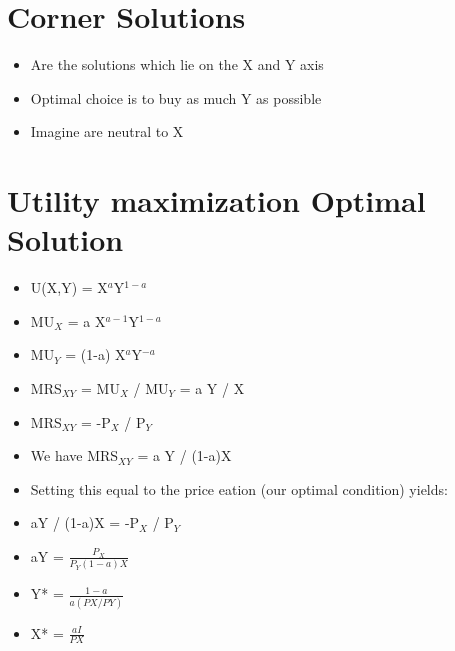 \documentclass{article}
\begin{document}
\section*{Corner Solutions}
\begin{itemize}
  \item Are the solutions which lie on the X and Y axis
  \item Optimal choice is to buy as much Y as possible
  \item Imagine are neutral to X
\end{itemize}

\section*{Utility maximization \Rightarrow{} Optimal Solution}
\begin{itemize}
  \item U(X,Y) = X$^a$Y$^{1-a}$
  \item MU$_X$ = a \times X$^{a-1}$Y$^{1-a}$
  \item MU$_Y$ = (1-a) \times X$^a$Y$^{-a}$
  \item MRS$_{XY}$ = MU$_X$ / MU$_Y$ = a \times Y / X
  \item MRS$_{XY}$ = -P$_X$ / P$_Y$
  \item We have MRS$_{XY}$ = a \times Y / (1-a)X
  \item Setting this equal to the price eation (our optimal condition) yields:
  \item aY / (1-a)X = -P$_X$ / P$_Y$
  \item aY = $\frac{P_X}{P_Y (1-a)X}$
  \item Y* = $\frac{1-a}{a (PX/PY)}$
  \item X* = $\frac{aI}{PX}$
\end{itemize}
\end{document}
